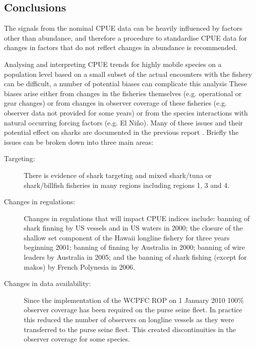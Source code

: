       


      



\subsection{Conclusions}

The signals from the nominal  CPUE data can be heavily influenced by factors other than abundance, and therefore a procedure to standardise CPUE data for changes in factors  that do not reflect changes in abundance is recommended. 

 
Analysing and interpreting CPUE trends for highly mobile species on a population level based on a small subset of the actual encounters with the fishery can be difficult, a number of potential biases can complicate this analysis   These biases arise either from changes in the fisheries themselves (e.g. operational or gear changes) or from changes in observer coverage of these fisheries (e.g. observer data not provided for some years) or from the species interactions with natural occurring forcing factors (e.g. El Ni\~no). Many of these issues and their potential effect on sharks are documented in the previous report \citep{Clarke2011_a}.  %
Briefly the issues can be broken down into three main areas:
\begin{description}
\item[Targeting:] There is evidence of shark targeting and mixed shark/tuna or shark/billfish fisheries in many regions including regions 1, 3 and 4. 
\item[Changes in regulations:] Changes in regulations that will impact CPUE indices include: banning of shark finning by US vessels and in US waters in 2000; the closure of the shallow set component of the Hawaii longline fishery for three years beginning 2001; banning of  finning by Australia in 2000; banning of wire leaders by Australia in 2005; and the banning of shark fishing (except for makos) by French Polynesia in 2006.
\item[Changes in data availability:] Since the implementation of the WCPFC ROP on 1 January 2010 100\% observer coverage has been required on the purse seine fleet. In practice this reduced the number of observers on longline vessels as they were transferred to the purse seine fleet. This created discontinuities in the observer coverage for some species.
\end{description}

